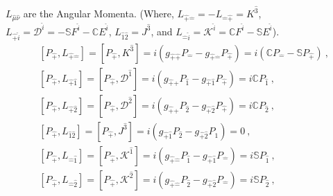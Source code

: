 \documentclass[12pt,a4paper]{report}
\begin{document}
$L_{\hat{\mu}\hat{\nu}}$ are the Angular Momenta. (Where, $L_{\hat{+}\hat{-}}=-L_{\hat{-}\hat{+}}=K^\hat{3}$,$L_{\hat{+}\hat{i}}=\mathcal{D}^{\hat{i}}=-\mathbb{S}F^{\hat{i}}-\mathbb{C}E^{\hat{i}}$, $L_{\hat{1}\hat{2}}=J^\hat{3}$, and $L_{\hat{-}\hat{i}}=\mathcal{K}^{\hat{i}}=\mathbb{C}F^{\hat{i}}-\mathbb{S}E^{\hat{i}}$). 
\begin{align*}
    &\left[P_{\hat{+}},L_{\hat{+}\hat{-}}\right]=\left[P_{\hat{+}},K^{\hat{3}}\right]=i\left(g_{\hat{+}\hat{+}}P_{\hat{-}}-g_{\hat{+}\hat{-}}P_{\hat{+}}\right)=i\left(\mathbb{C}P_{\hat{-}}-\mathbb{S}P_{\hat{+}}\right)~,\\
    &\left[P_{\hat{+}},L_{\hat{+}\hat{1}}\right]=\left[P_{\hat{+}},\mathcal{D}^\hat{1}\right]=i\left(g_{\hat{+}\hat{+}}P_{\hat{1}}-g_{\hat{+}\hat{1}}P_{\hat{+}}\right)=i\mathbb{C}P_{\hat{1}}~,\\
    &\left[P_{\hat{+}},L_{\hat{+}\hat{2}}\right]=\left[P_{\hat{+}},\mathcal{D}^\hat{2}\right]=i\left(g_{\hat{+}\hat{+}}P_{\hat{2}}-g_{\hat{+}\hat{2}}P_{\hat{+}}\right)=i\mathbb{C}P_{\hat{2}}~,\\
    &\left[P_{\hat{+}},L_{\hat{1}\hat{2}}\right]=\left[P_{\hat{+}},J^\hat{3}\right]=i\left(g_{\hat{+}\hat{1}}P_{\hat{2}}-g_{\hat{+}\hat{2}}P_{\hat{1}}\right)=0~,\\
    &\left[P_{\hat{+}},L_{\hat{-}\hat{1}}\right]=\left[P_{\hat{+}},\mathcal{K}^\hat{1}\right]=i\left(g_{\hat{+}\hat{-}}P_{\hat{1}}-g_{\hat{+}\hat{1}}P_{\hat{-}}\right)=i\mathbb{S}P_{\hat{1}}~,\\
    &\left[P_{\hat{+}},L_{\hat{-}\hat{2}}\right]=\left[P_{\hat{+}},\mathcal{K}^\hat{2}\right]=i\left(g_{\hat{+}\hat{-}}P_{\hat{2}}-g_{\hat{+}\hat{2}}P_{\hat{-}}\right)=i\mathbb{S}P_{\hat{2}}~,
    \end{align*}
\end{document}
